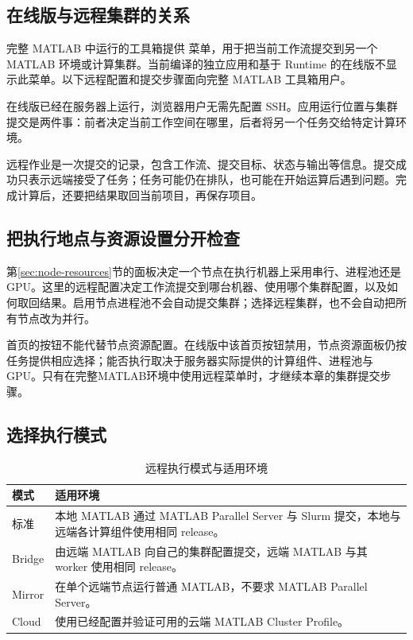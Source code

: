\subsection{在线版与远程集群的关系}

完整 MATLAB\regmark{} 中运行的工具箱提供  菜单，用于把当前工作流提交到另一个 MATLAB\regmark{} 环境或计算集群。当前编译的独立应用和基于 Runtime 的在线版不显示此菜单。以下远程配置和提交步骤面向完整 MATLAB\regmark{} 工具箱用户。

在线版已经在服务器上运行，浏览器用户无需先配置 SSH。应用运行位置与集群提交是两件事：前者决定当前工作空间在哪里，后者将另一个任务交给特定计算环境。

远程作业是一次提交的记录，包含工作流、提交目标、状态与输出等信息。提交成功只表示远端接受了任务；任务可能仍在排队，也可能在开始运算后遇到问题。完成计算后，还要把结果取回当前项目，再保存项目。

\subsection{把执行地点与资源设置分开检查}

第\ref{sec:node-resources}节的面板决定一个节点在执行机器上采用串行、进程池还是GPU。这里的远程配置决定工作流提交到哪台机器、使用哪个集群配置，以及如何取回结果。启用节点进程池不会自动提交集群；选择远程集群，也不会自动把所有节点改为并行。

首页的按钮不能代替节点资源配置。在线版中该首页按钮禁用，节点资源面板仍按任务提供相应选择；能否执行取决于服务器实际提供的计算组件、进程池与GPU。只有在完整MATLAB\regmark{}环境中使用远程菜单时，才继续本章的集群提交步骤。

\subsection{选择执行模式}

\begin{table}[htbp]
\centering
\caption{远程执行模式与适用环境}
\begin{tabularx}{\linewidth}{lX}
\toprule
模式 & 适用环境 \\
\midrule
标准 & 本地 MATLAB\regmark{} 通过 MATLAB\regmark{} Parallel Server 与 Slurm 提交，本地与远端各计算组件使用相同 release。\\
Bridge & 由远端 MATLAB\regmark{} 向自己的集群配置提交，远端 MATLAB\regmark{} 与其 worker 使用相同 release。\\
Mirror & 在单个远端节点运行普通 MATLAB\regmark{}，不要求 MATLAB\regmark{} Parallel Server。\\
Cloud & 使用已经配置并验证可用的云端 MATLAB\regmark{} Cluster Profile。\\
\bottomrule
\end{tabularx}
\end{table}

